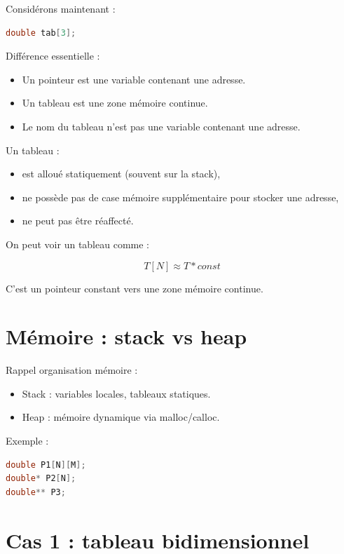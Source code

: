 Considérons maintenant :

\begin{lstlisting}[language=C]
double tab[3];
\end{lstlisting}

Différence essentielle :

\begin{itemize}
\item Un pointeur est une variable contenant une adresse.
\item Un tableau est une zone mémoire continue.
\item Le nom du tableau n’est pas une variable contenant une adresse.
\end{itemize}

Un tableau :

\begin{itemize}
\item est alloué statiquement (souvent sur la stack),
\item ne possède pas de case mémoire supplémentaire pour stocker une adresse,
\item ne peut pas être réaffecté.
\end{itemize}

On peut voir un tableau comme :

\[
\boxed{
T[N] \approx T* const
}
\]

C’est un pointeur constant vers une zone mémoire continue.

\section{Mémoire : stack vs heap}

Rappel organisation mémoire :

\begin{itemize}
\item Stack : variables locales, tableaux statiques.
\item Heap : mémoire dynamique via malloc/calloc.
\end{itemize}

Exemple :

\begin{lstlisting}[language=C]
double P1[N][M];
double* P2[N];
double** P3;
\end{lstlisting}

\section{Cas 1 : tableau bidimensionnel}

